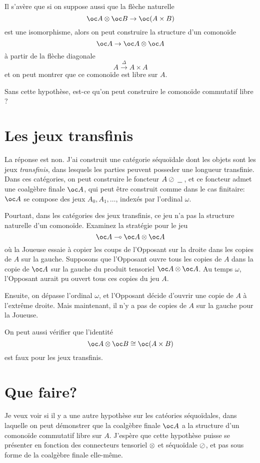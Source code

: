 \documentclass[11pt]{article}
\begin{document}
Il s'av\`{e}re que si on suppose aussi que la fl\`{e}che naturelle
\[
  \oc A \tensor \oc B \to \oc(A\times B)
  \]
est une isomorphisme, alors on peut construire la structure d'un comono\"{i}de
\[
  \oc A \to \oc A \tensor \oc A
  \]
\`{a} partir de la fl\`{e}che diagonale
\[
  A \xrightarrow{\Delta} A \times A
  \]
et on peut montrer que ce comono\"{i}de est libre sur $A$.  

Sans cette hypoth\`{e}se, est-ce qu'on peut construire le comono\"{i}de commutatif libre ?

\section{Les jeux transfinis}

La r\'{e}ponse est non.  J'ai construit une cat\'{e}gorie s\'{e}quo\"{i}dale dont les objets sont les jeux \emph{transfinis}, dans lesquels les parties peuvent posseder une longueur transfinie.  Dans ces cat\'{e}gories, on peut construire le foncteur $A\oslash\;\underline{\hspace{1.5ex}}\;$, et ce foncteur admet une coalg\`{e}bre finale $\oc A$, qui peut \^{e}tre construit comme dans le cas finitaire: $\oc A$ se compose des jeux $A_0, A_1, \dots$, index\'{e}s par l'ordinal $\omega$.  

Pourtant, dans les cat\'{e}gories des jeux transfinis, ce jeu n'a pas la structure naturelle d'un comono\"{i}de.  Examinez la strat\'{e}gie pour le jeu
\[
  \oc A \implies \oc A \tensor \oc A
  \]
o\`{u} la Joueuse essaie \`{a} copier les coups de l'Opposant sur la droite dans les copies de $A$ sur la gauche.  Supposons que l'Opposant ouvre tous les copies de $A$ dans la copie de $\oc A$ sur la gauche du produit tensoriel $\oc A \tensor \oc A$.  Au temps $\omega$, l'Opposant aurait pu ouvert tous ces copies du jeu $A$.  

Ensuite, on d\'{e}passe l'ordinal $\omega$, et l'Opposant d\'{e}cide d'ouvrir une copie de $A$ \`{a} l'extr\^{e}me droite.  Mais maintenant, il n'y a pas de copies de $A$ sur la gauche pour la Joueuse.  

On peut aussi v\'{e}rifier que l'identit\'{e}
\[
  \oc A \tensor \oc B \cong \oc(A\times B)
  \]
est faux pour les jeux transfinis.

\section{Que faire?}

Je veux voir si il y a une autre hypoth\`{e}se sur les cat\'{e}ories s\'{e}quo\"{i}dales, dans laquelle on peut d\'{e}monstrer que la coalg\`{e}bre finale $\oc A$ a la structure d'un comono\"{i}de commutatif libre sur $A$.  J'esp\`{e}re que cette hypoth\`{e}se puisse se pr\'{e}senter en fonction des connecteurs tensoriel $\otimes$ et s\'{e}quo\"{i}dale $\oslash$, et pas sous forme de la coalg\`{e}bre finale elle-m\^{e}me.  
\end{document}
